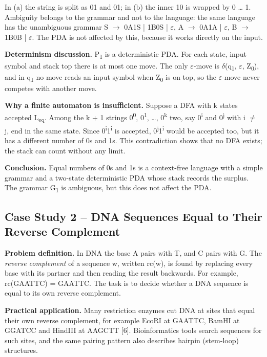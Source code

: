 \documentclass[12pt,a4paper]{article}
\begin{document}
In (a) the string is split as 01 and 01; in (b) the inner 10 is wrapped by 0 \ldots{} 1. Ambiguity belongs to the grammar and not to the language: the same language has the unambiguous grammar S \ensuremath{\rightarrow} 0A1S | 1B0S | \ensuremath{\varepsilon}, A \ensuremath{\rightarrow} 0A1A | \ensuremath{\varepsilon}, B \ensuremath{\rightarrow} 1B0B | \ensuremath{\varepsilon}. The PDA is not affected by this, because it works directly on the input.

\textbf{Determinism discussion.} P\textsubscript{1} is a deterministic PDA. For each state, input symbol and stack top there is at most one move. The only \ensuremath{\varepsilon}-move is \ensuremath{\delta}(q\textsubscript{1}, \ensuremath{\varepsilon}, Z\textsubscript{0}), and in q\textsubscript{1} no move reads an input symbol when Z\textsubscript{0} is on top, so the \ensuremath{\varepsilon}-move never competes with another move.

\textbf{Why a finite automaton is insufficient.} Suppose a DFA with k states accepted L\textsubscript{eq}. Among the k + 1 strings 0\textsuperscript{0}, 0\textsuperscript{1}, \ldots{}, 0\textsuperscript{k} two, say 0\textsuperscript{i} and 0\textsuperscript{j} with i \ensuremath{\neq} j, end in the same state. Since 0\textsuperscript{i}1\textsuperscript{i} is accepted, 0\textsuperscript{j}1\textsuperscript{i} would be accepted too, but it has a different number of 0s and 1s. This contradiction shows that no DFA exists; the stack can count without any limit.

\textbf{Conclusion.} Equal numbers of 0s and 1s is a context-free language with a simple grammar and a two-state deterministic PDA whose stack records the surplus. The grammar G\textsubscript{1} is ambiguous, but this does not affect the PDA.

\subsection{Case Study 2 -- DNA Sequences Equal to Their Reverse Complement}

\textbf{Problem definition.} In DNA the base A pairs with T, and C pairs with G. The \textit{reverse complement} of a sequence w, written rc(w), is found by replacing every base with its partner and then reading the result backwards. For example, rc(GAATTC) = GAATTC. The task is to decide whether a DNA sequence is equal to its own reverse complement.

\textbf{Practical application.} Many restriction enzymes cut DNA at sites that equal their own reverse complement, for example EcoRI at GAATTC, BamHI at GGATCC and HindIII at AAGCTT [6]. Bioinformatics tools search sequences for such sites, and the same pairing pattern also describes hairpin (stem-loop) structures.
\end{document}
